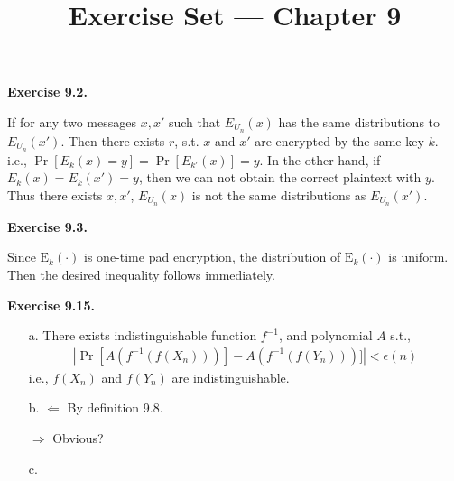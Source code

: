 \documentclass[a4paper]{article}
\title{Exercise Set --- Chapter 9}
\date{}
\newenvironment{exercise}[1]{
	\par
	\noindent\textbf{Exercise #1.}\quad
}{
	\par
	\bigskip
}
\newcommand{\cbra}[1]{\left\{ #1 \right\}}
\newcommand{\bin}{\{0,1\}}
\begin{document}
    \maketitle

\begin{exercise}{9.2}
If for any two messages $x,x'$ such that $E_{U_{n}}(x)$ has the same distributions to $E_{U_{n}}(x')$. Then there exists $r$, s.t. $x$ and $x'$ are encrypted by the same key $k$. i.e., $\Pr[E_{k}(x) = y] = \Pr[E_{k'}(x)] = y$. In the other hand, if $E_{k}(x) = E_{k}(x') = y$, then we can not obtain the correct plaintext with $y$. Thus there exists $x,x'$, $E_{U_{n}}(x)$ is not the same distributions as $E_{U_{n}}(x')$. 
\end{exercise}

	\begin{exercise}{9.3}
        Since $\mathrm E_k(\cdot)$ is one-time pad encryption, the distribution of $\mathrm E_k(\cdot)$ is uniform.
        Then the desired inequality follows immediately.
	\end{exercise}

\begin{exercise}{9.15}
\begin{itemize}
\item [a.] There exists indistinguishable function $f^{-1}$, and polynomial $A$ s.t.,
\begin{align*}
|\Pr[A(f^{-1}(f(X_{n})))] - A(f^{-1}(f(Y_{n})))]|<\epsilon(n)
\end{align*}
i.e., $f(X_{n})$ and $f(Y_{n})$ are indistinguishable.
\item[b.] $\Leftarrow$ By definition 9.8.

$\Rightarrow$ Obvious?
\item[c.] 
\end{itemize}
\end{exercise}

%
\end{document}
